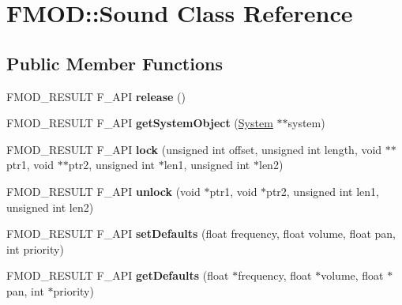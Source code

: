 \hypertarget{class_f_m_o_d_1_1_sound}{\section{F\-M\-O\-D\-:\-:Sound Class Reference}
\label{class_f_m_o_d_1_1_sound}
}
\subsection*{Public Member Functions}
\begin{DoxyCompactItemize}
\item 
\hypertarget{class_f_m_o_d_1_1_sound_ab0d8425b6f8ad26b4011dc36fee9948c}{F\-M\-O\-D\-\_\-\-R\-E\-S\-U\-L\-T F\-\_\-\-A\-P\-I {\bfseries release} ()}\label{class_f_m_o_d_1_1_sound_ab0d8425b6f8ad26b4011dc36fee9948c}

\item 
\hypertarget{class_f_m_o_d_1_1_sound_aed24d7342fc12299472454730828987e}{F\-M\-O\-D\-\_\-\-R\-E\-S\-U\-L\-T F\-\_\-\-A\-P\-I {\bfseries get\-System\-Object} (\hyperlink{class_f_m_o_d_1_1_system}{System} $\ast$$\ast$system)}\label{class_f_m_o_d_1_1_sound_aed24d7342fc12299472454730828987e}

\item 
\hypertarget{class_f_m_o_d_1_1_sound_a0f83fccead6df86323a21a0ae0207c61}{F\-M\-O\-D\-\_\-\-R\-E\-S\-U\-L\-T F\-\_\-\-A\-P\-I {\bfseries lock} (unsigned int offset, unsigned int length, void $\ast$$\ast$ptr1, void $\ast$$\ast$ptr2, unsigned int $\ast$len1, unsigned int $\ast$len2)}\label{class_f_m_o_d_1_1_sound_a0f83fccead6df86323a21a0ae0207c61}

\item 
\hypertarget{class_f_m_o_d_1_1_sound_ab80dbd8fdc67d3b4c0358de311865da3}{F\-M\-O\-D\-\_\-\-R\-E\-S\-U\-L\-T F\-\_\-\-A\-P\-I {\bfseries unlock} (void $\ast$ptr1, void $\ast$ptr2, unsigned int len1, unsigned int len2)}\label{class_f_m_o_d_1_1_sound_ab80dbd8fdc67d3b4c0358de311865da3}

\item 
\hypertarget{class_f_m_o_d_1_1_sound_a287c29ce3062fd49c77732dc71353a5e}{F\-M\-O\-D\-\_\-\-R\-E\-S\-U\-L\-T F\-\_\-\-A\-P\-I {\bfseries set\-Defaults} (float frequency, float volume, float pan, int priority)}\label{class_f_m_o_d_1_1_sound_a287c29ce3062fd49c77732dc71353a5e}

\item 
\hypertarget{class_f_m_o_d_1_1_sound_a252e31cdc8bc20be31ce553c54aff2f4}{F\-M\-O\-D\-\_\-\-R\-E\-S\-U\-L\-T F\-\_\-\-A\-P\-I {\bfseries get\-Defaults} (float $\ast$frequency, float $\ast$volume, float $\ast$pan, int $\ast$priority)}\label{class_f_m_o_d_1_1_sound_a252e31cdc8bc20be31ce553c54aff2f4}


\end{DoxyCompactItemize}

